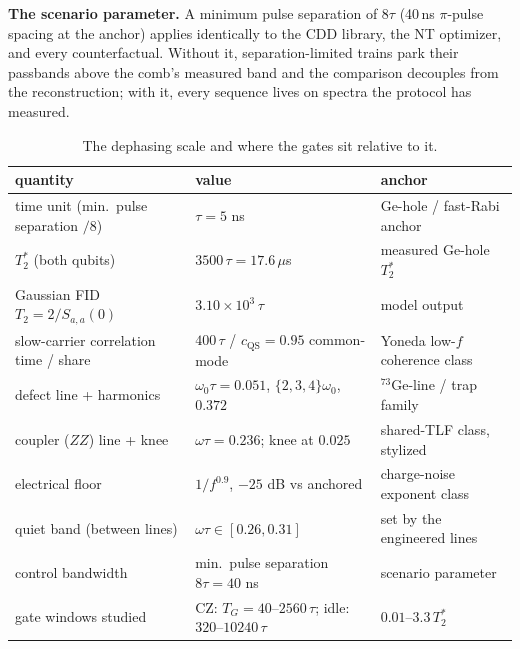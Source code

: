 \documentclass[10pt]{article}
\newcommand{\TG}{T_G}
\begin{document}
\textbf{The scenario parameter.} A minimum pulse separation of $8\tau$
(40\,ns $\pi$-pulse spacing at the anchor) applies identically to the CDD
library, the NT optimizer, and every counterfactual. Without it,
separation-limited trains park their passbands above the comb's measured
band and the comparison decouples from the reconstruction; with it, every
sequence lives on spectra the protocol has measured.

\begin{table}[h!]
\centering\small
\begin{tabular}{lll}
\toprule
quantity & value & anchor \\
\midrule
time unit (min.\ pulse separation $/8$) & $\tau = 5$ ns & Ge-hole / fast-Rabi anchor \\
$T_2^{*}$ (both qubits) & $3500\,\tau = 17.6\,\mu$s & measured Ge-hole $T_2^*$ \\
Gaussian FID $T_2 = 2/S_{a,a}(0)$ & $3.10\times10^3\,\tau$ & model output \\
slow-carrier correlation time / share & $400\,\tau$ / $c_{\mathrm{QS}} = 0.95$ common-mode & Yoneda low-$f$ coherence class \\
defect line + harmonics & $\omega_0\tau = 0.051$, $\{2,3,4\}\omega_0$, $0.372$ & $^{73}$Ge-line / trap family \\
coupler ($ZZ$) line + knee & $\omega\tau = 0.236$; knee at $0.025$ & shared-TLF class, stylized \\
electrical floor & $1/f^{0.9}$, $-25$ dB vs anchored & charge-noise exponent class \\
quiet band (between lines) & $\omega\tau \in [0.26, 0.31]$ & set by the engineered lines \\
control bandwidth & min.\ pulse separation $8\tau = 40$ ns & scenario parameter \\
gate windows studied & CZ: $\TG = 40$--$2560\,\tau$; idle: $320$--$10240\,\tau$ & $0.01$--$3.3\,T_2^*$ \\
\bottomrule
\end{tabular}
\caption{The dephasing scale and where the gates sit relative to it.}
\label{tab:anchor}
\end{table}
\end{document}
